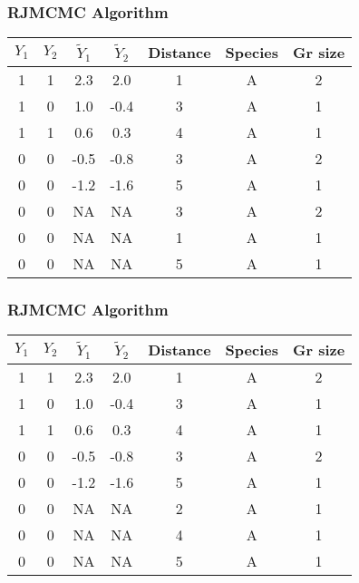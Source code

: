 \documentclass[serif,mathserif]{beamer}
\begin{document}
\begin{frame}
  \frametitle{RJMCMC Algorithm}
         \begin{tabular}{ccccccc}
        \hline \hline
        $Y_1$ & $Y_2$ & $\tilde{Y}_1$ & $\tilde{Y}_2$ & Distance & Species & Gr size\\
        \hline
        1 & 1 & 2.3 & 2.0 & 1 & A & 2\\
        1 & 0 & 1.0 & -0.4 & 3 & A & 1 \\
        1 & 1 & 0.6 & 0.3 & 4 & A & 1 \\
        0 & 0 & -0.5 & -0.8 & 3 & A & 2 \\
        0 & 0 & -1.2 & -1.6 & 5 & A & 1 \\
        \rowcolor{noaaturq}
        0 & 0 & NA & NA & 3 & A & 2 \\
        \rowcolor{noaaturq}
        0 & 0 & NA & NA & 1 & A & 1 \\
        \rowcolor{noaaturq}
        0 & 0 & NA & NA & 5 & A & 1 \\
         \hline
        \end{tabular}
\end{frame}

\begin{frame}
  \frametitle{RJMCMC Algorithm}
         \begin{tabular}{ccccccc}
        \hline \hline
        $Y_1$ & $Y_2$ & $\tilde{Y}_1$ & $\tilde{Y}_2$ & Distance & Species & Gr size\\
        \hline
        1 & 1 & 2.3 & 2.0 & 1 & A & 2\\
        1 & 0 & 1.0 & -0.4 & 3 & A & 1 \\
        1 & 1 & 0.6 & 0.3 & 4 & A & 1 \\
        0 & 0 & -0.5 & -0.8 & 3 & A & 2 \\
        0 & 0 & -1.2 & -1.6 & 5 & A & 1 \\
        0 & 0 & NA & NA & \cellcolor{noaaturq} 2 & A & \cellcolor{noaaturq} 1 \\
        0 & 0 & NA & NA & \cellcolor{noaaturq} 4 & A & \cellcolor{noaaturq} 1 \\
        0 & 0 & NA & NA & \cellcolor{noaaturq} 5 & A & \cellcolor{noaaturq} 1 \\
         \hline
        \end{tabular}
\end{frame}
\end{document}
